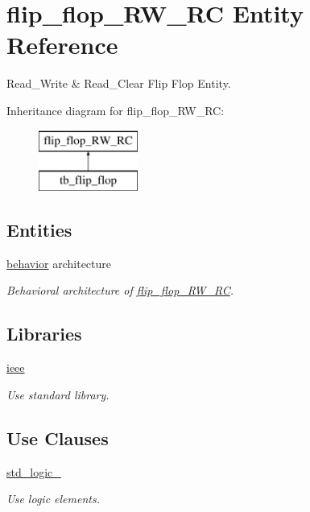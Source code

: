 \hypertarget{classflip__flop___r_w___r_c}{}\section{flip\+\_\+flop\+\_\+\+R\+W\+\_\+\+RC Entity Reference}
\label{classflip__flop___r_w___r_c}


Read\+\_\+\+Write \& Read\+\_\+\+Clear Flip Flop Entity.  


Inheritance diagram for flip\+\_\+flop\+\_\+\+R\+W\+\_\+\+RC\+:\begin{figure}[H]
\begin{center}
\leavevmode
\includegraphics[height=2.000000cm]{classflip__flop___r_w___r_c}
\end{center}
\end{figure}
\subsection*{Entities}
\begin{DoxyCompactItemize}
\item 
\hyperlink{classflip__flop___r_w___r_c_1_1behavior}{behavior} architecture
\begin{DoxyCompactList}\small\item\em Behavioral architecture of \hyperlink{classflip__flop___r_w___r_c}{flip\+\_\+flop\+\_\+\+R\+W\+\_\+\+RC}. \end{DoxyCompactList}\end{DoxyCompactItemize}
\subsection*{Libraries}
 \begin{DoxyCompactItemize}
\item 
\hyperlink{classflip__flop___r_w___r_c_a0a6af6eef40212dbaf130d57ce711256}{ieee} 
\begin{DoxyCompactList}\small\item\em Use standard library. \end{DoxyCompactList}\end{DoxyCompactItemize}
\subsection*{Use Clauses}
 \begin{DoxyCompactItemize}
\item 
\hyperlink{classflip__flop___r_w___r_c_acd03516902501cd1c7296a98e22c6fcb}{std\+\_\+logic\+\_}   
\begin{DoxyCompactList}\small\item\em Use logic elements. \end{DoxyCompactList}\end{DoxyCompactItemize}
